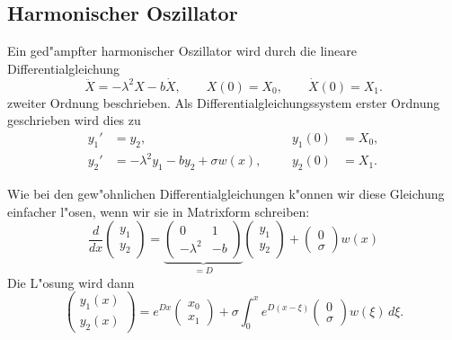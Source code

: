 \subsection{Harmonischer Oszillator\label{linear:harmosz}}
Ein ged"ampfter harmonischer Oszillator wird durch die lineare
%
%
Differentialgleichung
\begin{equation}
\ddot X=-\lambda^2 X-b\dot X,\qquad X(0)=X_0,\qquad \dot X(0)=X_1.
\label{linear:harmosz-dgl2}
\end{equation}
zweiter Ordnung beschrieben.
Als Differentialgleichungssystem erster Ordnung geschrieben wird dies zu
\begin{equation}
\begin{aligned}
y_1'&=y_2,                              &&&y_1(0)&=X_0, \\
y_2'&=-\lambda^2 y_1-by_2 + \sigma w(x),&&&y_2(0)&=X_1.
\end{aligned}
\label{stochastsich:harmosz-dgl1}
\end{equation}

Wie bei den gew"ohnlichen Differentialgleichungen k"onnen wir diese
Gleichung einfacher l"osen, wenn wir sie in Matrixform schreiben:
\begin{equation}
\frac{d}{dx} \begin{pmatrix}y_1\\y_2\end{pmatrix}
=
\underbrace{
\begin{pmatrix}
         0& 1\\
-\lambda^2&-b
\end{pmatrix}}_{\displaystyle=D}
\begin{pmatrix}y_1\\y_2\end{pmatrix}
+
\begin{pmatrix}
0\\\sigma
\end{pmatrix}w(x)
\end{equation}
Die L"osung wird dann
\begin{equation}
\begin{pmatrix}
y_1(x)\\y_2(x)
\end{pmatrix}
=
e^{Dx}\begin{pmatrix}x_0\\x_1\end{pmatrix}
+
\sigma \int_0^x e^{D(x-\xi)}\begin{pmatrix}0\\\sigma\end{pmatrix}w(\xi)\,d\xi.
\label{linear:harmosz-explsg}
\end{equation}

